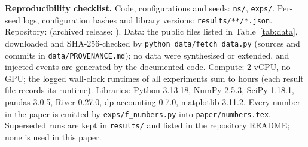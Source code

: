 \noindent\textbf{Reproducibility checklist.} Code, configurations and seeds: \texttt{ns/}, \texttt{exps/}. Per-seed logs, configuration hashes and library versions: \texttt{results/**/*.json}. Repository: \RepoURL{} (archived release: \ZenodoDOI). Data: the public files listed in Table~\ref{tab:data}, downloaded and SHA-256-checked by \texttt{python data/fetch\_data.py} (sources and commits in \texttt{data/PROVENANCE.md}); no data were synthesised or extended, and injected events are generated by the documented code. Compute: 2 vCPU, no GPU; the logged wall-clock runtimes of all experiments sum to \RuntimeHours{} hours (each result file records its runtime). Libraries: Python 3.13.18, NumPy 2.5.3, SciPy 1.18.1, pandas 3.0.5, River 0.27.0, dp-accounting 0.7.0, matplotlib 3.11.2. Every number in the paper is emitted by \texttt{exps/f\_numbers.py} into \texttt{paper/numbers.tex}. Superseded runs are kept in \texttt{results/} and listed in the repository README; none is used in this paper.
